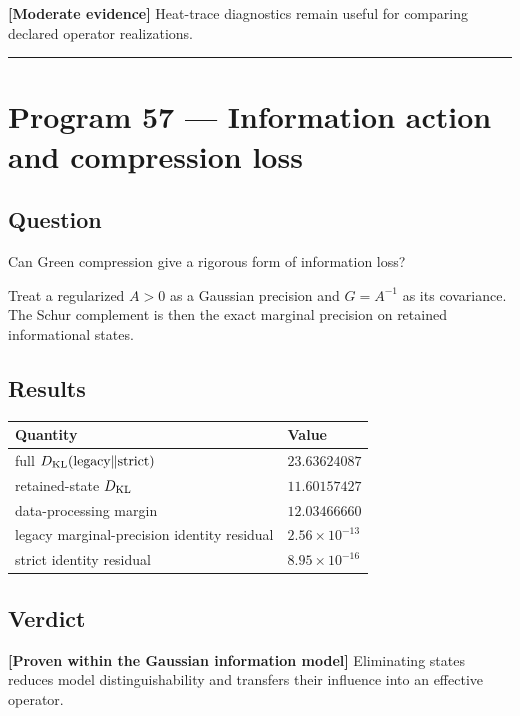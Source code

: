 \documentclass[11pt,a4paper,openany]{report}
\newcommand{\statusModerate}{\textcolor{finviolet}{[Moderate evidence]}}
\begin{document}
\textbf{\statusModerate{}} Heat-trace diagnostics remain useful for comparing declared operator realizations.

\par\medskip\hrule\medskip

\chapter{Program 57 — Information action and compression loss}

\section{Question}

Can Green compression give a rigorous form of information loss?

Treat a regularized \(A>0\) as a Gaussian precision and \(G=A^{-1}\) as its covariance. The Schur complement is then the exact marginal precision on retained informational states.

\section{Results}

\begin{center}
\begingroup\small
\setlength{\tabcolsep}{3.5pt}
\renewcommand{\arraystretch}{1.16}
\begin{longtable}{@{}p{}p{}@{}}
\toprule
\textbf{Quantity} & \textbf{Value} \\
\midrule
\endhead
full \(D_{\rm KL}(\text{legacy}\Vert\text{strict})\) & \(23.63624087\) \\
retained-state \(D_{\rm KL}\) & \(11.60157427\) \\
data-processing margin & \(12.03466660\) \\
legacy marginal-precision identity residual & \(2.56\times10^{-13}\) \\
strict identity residual & \(8.95\times10^{-16}\) \\
\bottomrule
\end{longtable}
\endgroup
\end{center}

\section{Verdict}

\textbf{[Proven within the Gaussian information model]} Eliminating states reduces model distinguishability and transfers their influence into an effective operator.
\end{document}
